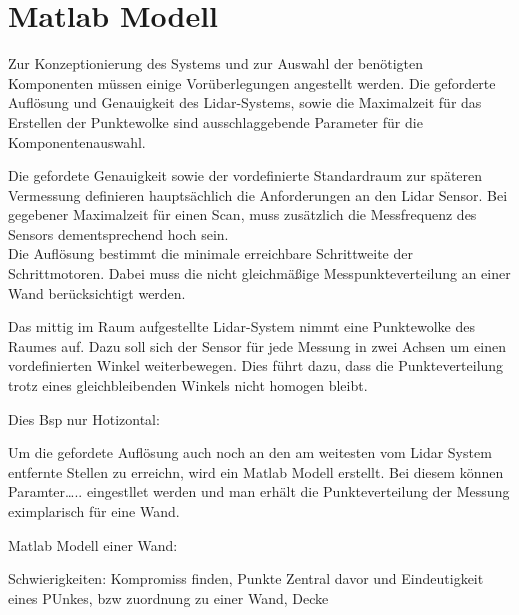 

\chapter{Matlab Modell}

Zur Konzeptionierung des Systems und zur Auswahl der benötigten Komponenten müssen einige Vorüberlegungen angestellt werden. Die geforderte Auflösung und Genauigkeit des Lidar-Systems, sowie die Maximalzeit für das Erstellen der Punktewolke sind ausschlaggebende Parameter für die Komponentenauswahl.

Die gefordete Genauigkeit sowie der vordefinierte Standardraum zur späteren Vermessung definieren hauptsächlich die Anforderungen an den Lidar Sensor. Bei gegebener Maximalzeit für einen Scan, muss zusätzlich die Messfrequenz des Sensors dementsprechend hoch sein. \\
Die Auflösung bestimmt die minimale erreichbare Schrittweite der Schrittmotoren. Dabei muss die nicht gleichmäßige Messpunkteverteilung an einer Wand berücksichtigt werden.

Das mittig im Raum aufgestellte Lidar-System nimmt eine Punktewolke des Raumes auf. Dazu soll sich der Sensor für jede Messung in zwei Achsen um einen vordefinierten Winkel weiterbewegen. Dies führt dazu, dass die Punkteverteilung trotz eines gleichbleibenden Winkels nicht homogen bleibt. 

Dies
Bsp nur Hotizontal:


Um die gefordete Auflösung auch noch an den am weitesten vom Lidar System entfernte Stellen zu erreichn, wird ein Matlab Modell erstellt. Bei diesem können Paramter….. eingestllet werden und man erhält die Punkteverteilung der Messung eximplarisch für eine Wand.

Matlab Modell einer Wand:

Schwierigkeiten:
Kompromiss finden, Punkte Zentral davor und 
Eindeutigkeit eines PUnkes, bzw zuordnung zu einer Wand, Decke